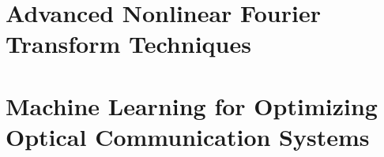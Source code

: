 %
%
%






\setlength{\parindent}{0pt}
\setlength{\parskip}{0pt} %
\frontmatter


\setcounter{page}{0}

% 


\cleardoublepage
{}
\tableofcontents

\cleardoublepage
{}
{} %
\listoffigures

\cleardoublepage
{}
{} %
\listoftables

\cleardoublepage
{}
{}


\setlength{\parskip}{1em}


\mainmatter

\cleardoublepage
\part{Advanced Nonlinear Fourier Transform Techniques}
% 




\cleardoublepage
\part{Machine Learning for Optimizing Optical Communication Systems}
% 
% 




